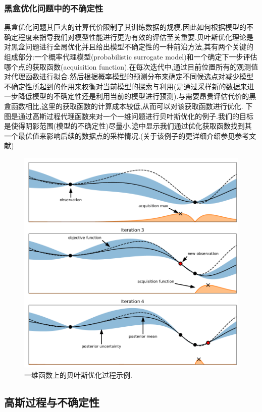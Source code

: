 \documentclass{ctexart}
\begin{document}
\subsubsection{黑盒优化问题中的不确定性}
黑盒优化问题其巨大的计算代价限制了其训练数据的规模,因此如何根据模型的不确定程度来指导我们对模型性能进行更为有效的评估至关重要.贝叶斯优化理论是对黑盒问题进行全局优化并且给出模型不确定性的一种前沿方法,其有两个关键的组成部分:一个概率代理模型(probabilistic surrogate model)和一个确定下一步评估哪个点的获取函数(acquisition function).在每次迭代中,通过目前位置所有的观测值对代理函数进行拟合.然后根据概率模型的预测分布来确定不同候选点对减少模型不确定性所起到的作用来权衡对当前模型的探索与利用(是通过采样新的数据来进一步降低模型的不确定性还是利用当前的模型进行预测).与需要昂贵评估代价的黑盒函数相比,这里的获取函数的计算成本较低,从而可以对该获取函数进行优化.
下图是通过高斯过程代理函数来对一个一维问题进行贝叶斯优化的例子.我们的目标是使得阴影范围(模型的不确定性)尽量小.途中显示我们通过优化获取函数找到其一个最优值来影响后续的数据点的采样情况.(关于该例子的更详细介绍参见参考文献\cite{gal2016uncertainty})
\begin{figure}[htb!]
	\centering
	\includegraphics[scale=0.6]{bayesin.png}
	\caption{一维函数上的贝叶斯优化过程示例.}
\end{figure}


\subsection{高斯过程与不确定性}
\end{document}

